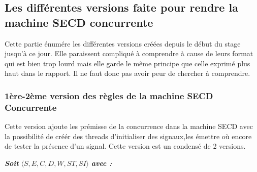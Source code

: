 \documentclass[10pt,a4paper]{article}
\begin{document}
		
			
		\subsection{Les différentes versions faite pour rendre la machine SECD concurrente}
		
			Cette partie énumére les différentes versions créées depuis le début du stage jusqu'à ce jour. Elle paraissent compliqué à comprendre à cause de leurs format qui est bien trop lourd mais elle garde le même principe que celle exprimé plus haut dans le rapport. Il ne faut donc pas avoir peur de chercher à comprendre.
		
			\subsubsection{1ère-2ème version des règles de la machine SECD Concurrente}\label{SECDConc1-2}
				\smallbreak
				Cette version ajoute les prémisse de la concurrence dans la machine SECD avec la possibilité de créér des threads d'initialiser des signaux,les émettre où encore de tester la présence d'un signal. Cette version est un condensé de 2 versions.
				\bigbreak
					
				\textbf{\textit{Soit}} $\langle S,E,C,D,W,ST,SI\rangle$ \textbf{\textit{avec :}}
					
\end{document}
